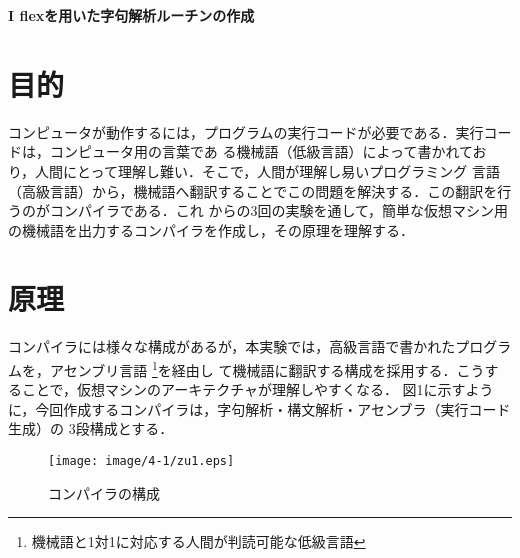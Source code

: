 \documentclass[a4j]{jsarticle}  %
\begin{document}
 

\thispagestyle{empty}
\setcounter{page}{0}




\newpage


\begin{center}
 {\Large \bf I flexを用いた字句解析ルーチンの作成}
\end{center}


\section{目的}
コンピュータが動作するには，プログラムの実行コードが必要である．実行コードは，コンピュータ用の言葉であ
る機械語（低級言語）によって書かれており，人間にとって理解し難い．そこで，人間が理解し易いプログラミング
言語（高級言語）から，機械語へ翻訳することでこの問題を解決する．この翻訳を行うのがコンパイラである．これ
からの3回の実験を通して，簡単な仮想マシン用の機械語を出力するコンパイラを作成し，その原理を理解する．


\section{原理}
コンパイラには様々な構成があるが，本実験では，高級言語で書かれたプログラムを，アセンブリ言語
\footnote{機械語と1対1に対応する人間が判読可能な低級言語}を経由し
て機械語に翻訳する構成を採用する．こうすることで，仮想マシンのアーキテクチャが理解しやすくなる．
図1に示すように，今回作成するコンパイラは，字句解析・構文解析・アセンブラ（実行コード生成）の
3段構成とする．

\begin{figure}[htbp]
\centering\texttt{[image: image/4-1/zu1.eps]}
\caption{コンパイラの構成}
\end{figure}
\end{document}
